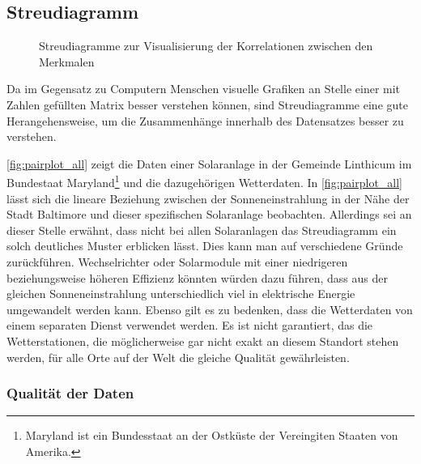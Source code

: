 \documentclass[12pt, a4paper]{article}
\begin{document}
\subsection{Streudiagramm}

\begin{figure}
\centering
\def\svgwidth{450pt}

\caption{Streudiagramme zur Visualisierung der Korrelationen zwischen den Merkmalen}
\label{fig:pairplot_all}
\end {figure}

Da im Gegensatz zu Computern Menschen visuelle Grafiken an Stelle einer mit Zahlen gefüllten Matrix besser verstehen können, sind Streudiagramme eine gute Herangehensweise, um die Zusammenhänge innerhalb des Datensatzes besser zu verstehen.

\autoref{fig:pairplot_all} zeigt die Daten einer Solaranlage in der Gemeinde Linthicum im Bundestaat Maryland\footnote{Maryland ist ein Bundesstaat an der Ostküste der Vereingiten Staaten von Amerika.} und die dazugehörigen Wetterdaten. In \autoref{fig:pairplot_all} lässt sich die lineare Beziehung zwischen der Sonneneinstrahlung in der Nähe der Stadt Baltimore und dieser spezifischen Solaranlage beobachten. Allerdings sei an dieser Stelle erwähnt, dass nicht bei allen Solaranlagen das Streudiagramm ein solch deutliches Muster erblicken lässt. Dies kann man auf verschiedene Gründe zurückführen. Wechselrichter oder Solarmodule mit einer niedrigeren beziehungsweise höheren Effizienz könnten würden dazu führen, dass aus der gleichen Sonneneinstrahlung unterschiedlich viel in elektrische Energie umgewandelt werden kann. Ebenso gilt es zu bedenken, dass die Wetterdaten von einem separaten Dienst verwendet werden. Es ist nicht garantiert, das die Wetterstationen, die möglicherweise gar nicht exakt an diesem Standort stehen werden, für alle Orte auf der Welt die gleiche Qualität gewährleisten.

\subsubsection{Qualität der Daten}
\end{document}
